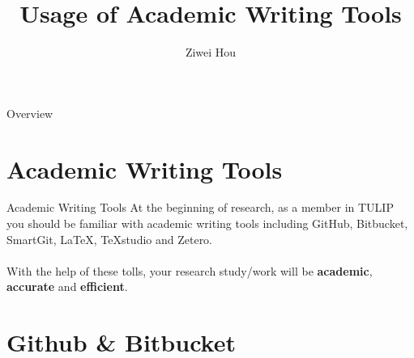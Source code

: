 \documentclass[
 size=12pt,
 paper=smartboard, %
 mode=present, %
 display=slides, %
style=tuliplab,
pauseslide,
fleqn,leqno]{powerdot}
\title{Usage of Academic Writing Tools}
\author{
Ziwei Hou
}
\date{\gitCommitterDate}
\begin{document}
\maketitle 

\begin{slide}[toc=,bm=]{Overview}
\tableofcontents[content=currentsection,type=1]
\end{slide}

\section{Academic Writing Tools}
\begin{slide}{Academic Writing Tools}
	At the beginning of research, as a member in TULIP you should be familiar 
	with academic writing tools including GitHub, 
	Bitbucket, 
	SmartGit,
	\LaTeX, 
	TeXstudio 
	and Zetero.\\~\\
	With the help of these tolls,
	your research study/work will be \textbf{academic}, 
	\textbf{accurate} and \textbf{efficient}.
\end{slide}

\section{Github \& Bitbucket}
\end{document}
